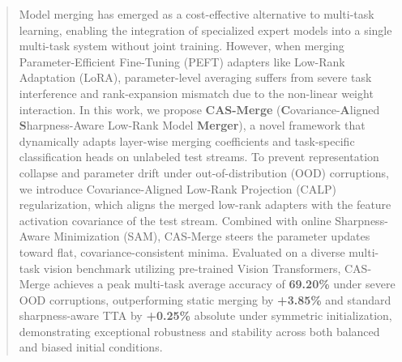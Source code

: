 \documentclass{article}
\begin{document}

\printAffiliationsAndNotice{}

\begin{abstract}
Model merging has emerged as a cost-effective alternative to multi-task learning, enabling the integration of specialized expert models into a single multi-task system without joint training. However, when merging Parameter-Efficient Fine-Tuning (PEFT) adapters like Low-Rank Adaptation (LoRA), parameter-level averaging suffers from severe task interference and rank-expansion mismatch due to the non-linear weight interaction. In this work, we propose \textbf{CAS-Merge} (\textbf{C}ovariance-\textbf{A}ligned \textbf{S}harpness-Aware Low-Rank Model \textbf{Merger}), a novel framework that dynamically adapts layer-wise merging coefficients and task-specific classification heads on unlabeled test streams. To prevent representation collapse and parameter drift under out-of-distribution (OOD) corruptions, we introduce Covariance-Aligned Low-Rank Projection (CALP) regularization, which aligns the merged low-rank adapters with the feature activation covariance of the test stream. Combined with online Sharpness-Aware Minimization (SAM), CAS-Merge steers the parameter updates toward flat, covariance-consistent minima. Evaluated on a diverse multi-task vision benchmark utilizing pre-trained Vision Transformers, CAS-Merge achieves a peak multi-task average accuracy of \textbf{69.20\%} under severe OOD corruptions, outperforming static merging by \textbf{+3.85\%} and standard sharpness-aware TTA by \textbf{+0.25\%} absolute under symmetric initialization, demonstrating exceptional robustness and stability across both balanced and biased initial conditions.
\end{abstract}
\end{document}

